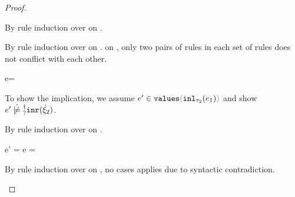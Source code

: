 \begin{proof}
\begin{byCases}
      By rule induction over  on .
      \begin{byCases}
        \item[\text{(\ref{rule:FVal})}]
          \begin{pfsteps}
          \item {}  
          \end{pfsteps}
          By rule induction over  on .
           on , only two pairs of rules in each set
          of rules does not conflict with each other.
          \begin{byCases}
            \item[\text{(\ref{rule:VInl}, \ref{rule:TInl})}]
              \begin{pfsteps}
              \item e= 
              \end{pfsteps}
              To show the implication, we assume $\inValues{e'}{\hinl{\tau_2}{e_1}}$ and show $\cnotsatisfyormay{e'}{\cinr{\hxi_2}}$.
              \begin{pfsteps}
              \item {}  
              \end{pfsteps}
              By rule induction over  on .
              \begin{byCases}
                \item[\text{(\ref{rule:IVVal})}]
                \begin{pfsteps}
                \item e' = e =  
                \item {} 
                \end{pfsteps}

                \item[\text{(\ref{rule:IVIndet})}]
                  \begin{pfsteps}
                  \item {}  
                  \end{pfsteps}
                  By rule induction over  on
                  , no cases applies due to syntactic contradiction.


\end{byCases}
\end{byCases}
\end{byCases}
\end{byCases}
\end{proof}
